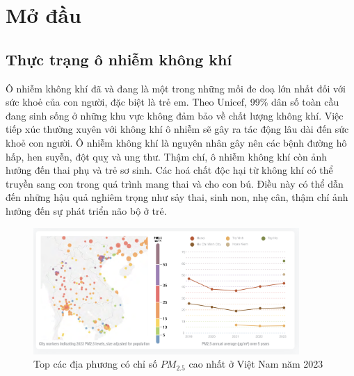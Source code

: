 \chapter{Mở đầu}
\section{Thực trạng ô nhiễm không khí}
Ô nhiễm không khí đã và đang là một trong những mối đe doạ lớn nhất đối với sức khoẻ của con người, đặc biệt là trẻ em. Theo Unicef, 99\% dân số toàn cầu đang sinh sống ở những khu vực không đảm bảo về chất lượng không khí. Việc tiếp xúc thường xuyên với không khí ô nhiễm sẽ gây ra tác động lâu dài đến sức khoẻ con người. Ô nhiễm không khí là nguyên nhân gây nên các bệnh đường hô hấp, hen suyễn, đột quỵ và ung thư. Thậm chí, ô nhiễm không khí còn ảnh hưởng đến thai phụ và trẻ sơ sinh. Các hoá chất độc hại từ không khí có thể truyền sang con trong quá trình mang thai và cho con bú. Điều này có thể dẫn đến những hậu quả nghiêm trọng như sảy thai, sinh non, nhẹ cân, thậm chí ảnh hưởng đến sự phát triển não bộ ở trẻ.

\begin{figure}[h]
    \centering
    \includegraphics[width=0.9\textwidth]{image/section1_1/aqi_city.png}
    \caption[Top các địa phương có chỉ số $PM_{2.5}$ cao nhất ở Việt Nam năm 2023]{Top các địa phương có chỉ số $PM_{2.5}$ cao nhất ở Việt Nam năm 2023 \cite{air-quality}}
    \label{fig:sec1_1_aqi_city}
\end{figure}

